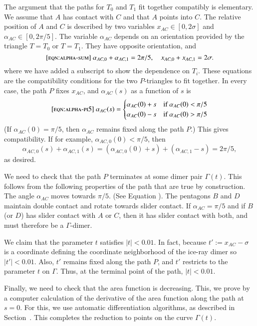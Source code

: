 The argument that the paths for $T_0$ and $T_1$ fit together
compatibly is elementary.  We assume that $A$ has contact with $C$ and
that $A$ points into $C$.  The relative position of $A$ and $C$ is
described by two variables $x_{AC}\in[0,2\sigma]$ and
$\alpha_{AC}\in[0,2\pi/5]$.  The variable $\alpha_{AC}$ depends on an
orientation provided by the triangle $T=T_0$ or $T=T_1$.  They have
opposite orientation, and
\begin{equation}\libel{eqn:alpha-sum}
\alpha_{AC,0}+\alpha_{AC,1} = 2\pi/5,\quad x_{AC,0} + x_{AC,1} = 2\sigma.
\end{equation}
where we have added a subscript to show the dependence on $T_i$.
These equations are the compatibility conditions for the two
$P$-triangles to fit together.  In every case, the path $P$ fixes
$x_{AC}$, and $\alpha_{AC}(s)$ as a function of $s$ is
\begin{equation}\libel{eqn:alpha-pi5}
\alpha_{AC}(s) = 
\begin{cases}
\alpha_{AC}(0) + s&\text{if } \alpha_{AC}(0) < \pi/5\\
\alpha_{AC}(0) - s&\text{if } \alpha_{AC}(0) > \pi/5\\
\end{cases}
\end{equation}
(If $\alpha_{AC}(0) = \pi/5$, then $\alpha_{AC}$ remains fixed along
the path $P$.)  This gives compatibility. If for example,
$\alpha_{AC,0}(0) < \pi/5$, then
\[
\alpha_{AC,0}(s) + \alpha_{AC,1}(s) 
= (\alpha_{AC,0}(0) + s) + (\alpha_{AC,1} - s) = 2\pi/5,
\]
as desired.

We need to check that the path $P$ terminates at some dimer pair
$\Gamma(t)$.  This follows from the following properties of the path
that are true by construction.  The angle $\alpha_{AC}$ moves towards
$\pi/5$. (See Equation ). The pentagons $B$ and $D$
maintain double contact and rotate towards slider contact.  If
$\alpha_{AC}=\pi/5$ and if $B$ (or $D$) has slider contact with $A$ or
$C$, then it has slider contact with both, and must therefore be a
$\Gamma$-dimer.

We claim that the parameter $t$ satisfies $|t|<0.01$.  In fact,
because $t' := x_{AC}-\sigma$ is a coordinate defining the coordinate
neighborhood of the ice-ray dimer so $|t'|<0.01$.  Also, $t'$ remains
fixed along the path $P$, and $t'$ restricts to the parameter $t$ on
$\Gamma$.  Thus, at the terminal point of the path, $|t|<0.01$.

Finally, we need to check that the area function is decreasing. This,
we prove by a computer calculation of the derivative of the area
function along the path at $s=0$.  For this, we use automatic
differentiation algorithms, as described in
Section~.  This completes the reduction to points
on the curve $\Gamma(t)$.

